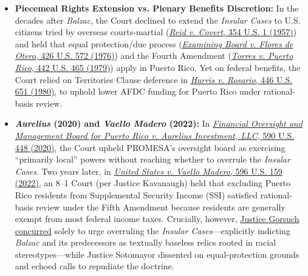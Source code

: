 \documentclass[12pt]{article}
\begin{document}
\begin{itemize}
  \item \textbf{Piecemeal Rights Extension vs. Plenary Benefits Discretion:} In the decades after \textit{Balzac}, the Court declined to extend the \textit{Insular Cases} to U.S. citizens tried by overseas courts-martial (\href{https://supreme.justia.com/cases/federal/us/354/1/}{\textit{Reid v. Covert}, 354 U.S. 1 (1957)}) and held that equal protection/due process (\href{https://supreme.justia.com/cases/federal/us/426/572/}{\textit{Examining Board v. Flores de Otero}, 426 U.S. 572 (1976)}) and the Fourth Amendment (\href{https://supreme.justia.com/cases/federal/us/442/465/}{\textit{Torres v. Puerto Rico}, 442 U.S. 465 (1979)}) apply in Puerto Rico. Yet on federal benefits, the Court relied on Territories Clause deference in \href{https://supreme.justia.com/cases/federal/us/446/651/}{\textit{Harris v. Rosario}, 446 U.S. 651 (1980)}, to uphold lower AFDC funding for Puerto Rico under rational-basis review.
  \item \textbf{\textit{Aurelius} (2020) and \textit{Vaello Madero} (2022):} In \href{https://supreme.justia.com/cases/federal/us/590/18-1334/}{\textit{Financial Oversight and Management Board for Puerto Rico v. Aurelius Investment, LLC}, 590 U.S. 448 (2020)}, the Court upheld PROMESA's oversight board as exercising ``primarily local'' powers without reaching whether to overrule the \textit{Insular Cases}. Two years later, in \href{https://www.law.cornell.edu/supremecourt/text/20-303}{\textit{United States v. Vaello Madero}, 596 U.S. 159 (2022)}, an 8--1 Court (per Justice Kavanaugh) held that excluding Puerto Rico residents from Supplemental Security Income (SSI) satisfied rational-basis review under the Fifth Amendment because residents are generally exempt from most federal income taxes. Crucially, however, \href{https://supreme.justia.com/cases/federal/us/596/20-303/}{Justice Gorsuch concurred} solely to urge overruling the \textit{Insular Cases}---explicitly indicting \textit{Balzac} and its predecessors as textually baseless relics rooted in racial stereotypes---while Justice Sotomayor dissented on equal-protection grounds and echoed calls to repudiate the doctrine.

\end{itemize}
\end{document}
